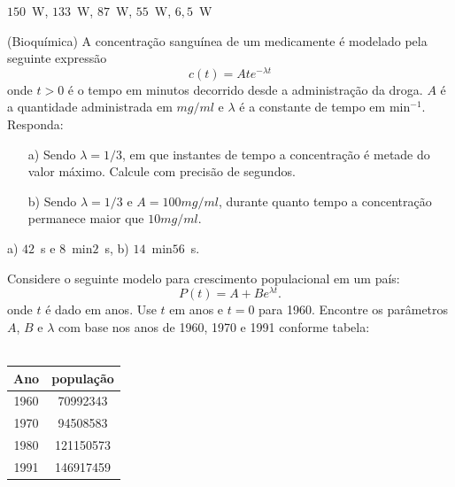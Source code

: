 \begin{ex}
\begin{resp}
$150$~W, $133$~W, $87$~W, $55$~W, $6,5$~W

\end{resp}




\begin{exer} (Bioquímica) A concentração sanguínea de um medicamente é modelado pela seguinte expressão
\begin{equation} c(t)=Ate^{-\lambda t} \end{equation}
onde $t>0$ é o tempo em minutos decorrido desde a administração da droga. $A$ é a quantidade administrada em $mg/ml$ e $\lambda$ é a constante de tempo em min$^{-1}$.
Responda:
\begin{itemize}
\item[a)] Sendo $\lambda=1/3$, em que instantes de tempo a concentração é metade do valor máximo. Calcule com precisão de segundos.
\item[b)] Sendo $\lambda=1/3$ e $A=100mg/ml$, durante quanto tempo a concentração permanece maior que $10mg/ml$.
\end{itemize}
\end{exer}

\begin{resp}

a) $42$~s e $8$~min$2$~s, b) $14$~min$56$~s.

\end{resp}


\begin{exer}\label{pop} Considere o seguinte modelo para crescimento populacional em um país:
\begin{equation} P(t)=A+Be^{\lambda t}. \end{equation}
onde $t$ é dado em anos. Use $t$ em anos e $t=0$ para 1960. Encontre os parâmetros $A$, $B$ e $\lambda$ com base nos anos de 1960, 1970 e 1991 conforme tabela:\\~

\begin{tabular}{|c|c|}
\hline
Ano & população\\
\hline
1960&70992343\\
1970&94508583\\
1980&121150573\\
1991&146917459\\
\hline
\end{tabular}


\end{exer}
\end{ex}
